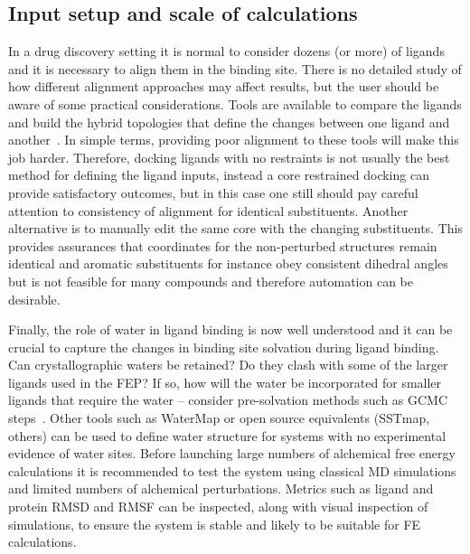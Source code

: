 \documentclass[9pt,bestpractices]{livecoms}
\begin{document}
\subsection{Input setup and scale of calculations}
In a drug discovery setting it is normal to consider dozens (or more) of ligands and it is necessary to align them in the binding site. There is no detailed study of how different alignment approaches may affect results, but the user should be aware of some practical considerations. Tools are available to compare the ligands and build the hybrid topologies that define the changes between one ligand and another~\cite{loeffler2015fesetup,hedges2019biosimspace,gapsys2015pmx}. In simple terms, providing poor alignment to these tools will make this job harder. Therefore, docking ligands with no restraints is not usually the best method for defining the ligand inputs, instead a core restrained docking can provide satisfactory outcomes, but in this case one still should pay careful attention to consistency of alignment for identical substituents. Another alternative is to manually edit the same core with the changing substituents. This provides assurances that coordinates for the non-perturbed structures remain identical and aromatic substituents for instance obey consistent dihedral angles but is not feasible for many compounds and therefore automation can be desirable. 

Finally, the role of water in ligand binding is now well understood and it can be crucial to capture the changes in binding site solvation during ligand binding. Can crystallographic waters be retained? Do they clash with some of the larger ligands used in the FEP? If so, how will the water be incorporated for smaller ligands that require the water – consider pre-solvation methods such as GCMC steps~\cite{michel2010prediction}. Other tools such as WaterMap or open source equivalents (SSTmap, others) can be used to define water structure for systems with no experimental evidence of water sites. Before launching large numbers of alchemical free energy calculations it is recommended to test the system using classical MD simulations and limited numbers of alchemical perturbations. Metrics such as ligand and protein RMSD and RMSF can be inspected, along with visual inspection of simulations, to ensure the system is stable and likely to be suitable for FE calculations. 
\end{document}
